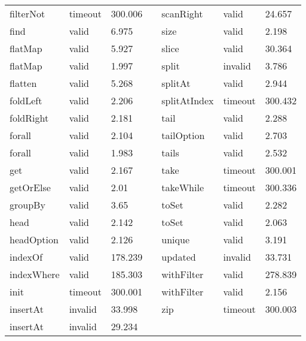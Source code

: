 \begin{table}[]
\begin{tabular}{lllllll}
filterNot  & timeout & 300.006 &  & scanRight     & valid   & 24.657  \\
find       & valid   & 6.975   &  & size          & valid   & 2.198   \\
flatMap    & valid   & 5.927   &  & slice         & valid   & 30.364  \\
flatMap    & valid   & 1.997   &  & split         & invalid & 3.786   \\
flatten    & valid   & 5.268   &  & splitAt       & valid   & 2.944   \\
foldLeft   & valid   & 2.206   &  & splitAtIndex  & timeout & 300.432 \\
foldRight  & valid   & 2.181   &  & tail          & valid   & 2.288   \\
forall     & valid   & 2.104   &  & tailOption    & valid   & 2.703   \\
forall     & valid   & 1.983   &  & tails         & valid   & 2.532   \\
get        & valid   & 2.167   &  & take          & timeout & 300.001 \\
getOrElse  & valid   & 2.01    &  & takeWhile     & timeout & 300.336 \\
groupBy    & valid   & 3.65    &  & toSet         & valid   & 2.282   \\
head       & valid   & 2.142   &  & toSet         & valid   & 2.063   \\
headOption & valid   & 2.126   &  & unique        & valid   & 3.191   \\
indexOf    & valid   & 178.239 &  & updated       & invalid & 33.731  \\
indexWhere & valid   & 185.303 &  & withFilter    & valid   & 278.839 \\
init       & timeout & 300.001 &  & withFilter    & valid   & 2.156   \\
insertAt   & invalid & 33.998  &  & zip           & timeout & 300.003 \\
insertAt   & invalid & 29.234  &  &               &         &        
\end{tabular}
\end{table}  